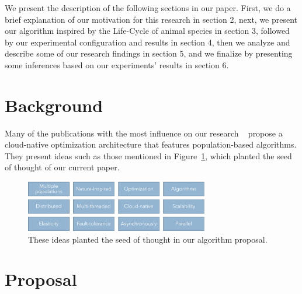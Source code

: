 \documentclass[runningheads]{llncs}
\begin{document}
We present the description of the following sections in our paper. First, we do
a brief explanation of our motivation for this research in section 2, next, we
present our algorithm inspired by the Life-Cycle of animal species in section
3, followed by our experimental configuration and results in section 4, then we
analyze and describe some of our research findings in section 5, and we
finalize by presenting some inferences based on our experiments' results in
section 6.

\section{Background}


Many of the publications with the most influence on our research
~\cite{valdez2021container,garcia2021event,merelo2016performance,merelo2016nodio}
propose a cloud-native optimization architecture that features population-based
algorithms. They present ideas such as those mentioned in Figure~\ref{fig1},
which planted the seed of thought of our current paper.

\begin{figure}
    \centering
    \includegraphics[width=80mm]{img/fig1_background.pdf}
    \caption{These ideas planted the seed of thought in our algorithm proposal.} \label{fig1}
    \end{figure}

\section{Proposal} 
\end{document}

